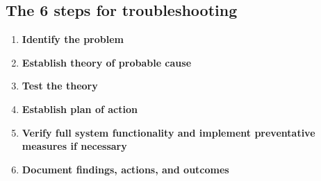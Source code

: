 \documentclass{article}
\begin{document}
\subsection{The 6 steps for troubleshooting}


\begin{enumerate}
    \item \textbf{Identify the problem}
    \item \textbf{Establish theory of probable cause}
    \item \textbf{Test the theory}
    \item \textbf{Establish plan of action}
    \item \textbf{Verify full system functionality and implement preventative measures if necessary}
    \item \textbf{Document findings, actions, and outcomes}
\end{enumerate}
\end{document}
